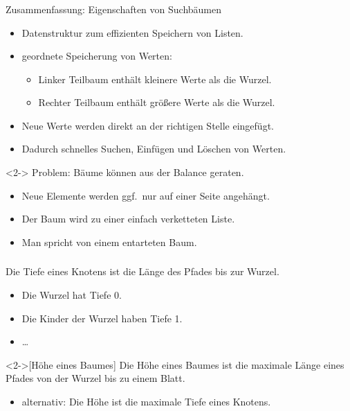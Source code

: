\begin{frame}
\frametitle{\insertsection}
\begin{block}
{Zusammenfassung: Eigenschaften von Suchbäumen}
\begin{itemize}
	\item Datenstruktur zum effizienten Speichern von Listen.
	\item geordnete Speicherung von Werten:
		\begin{itemize}
			\item Linker Teilbaum enthält kleinere Werte als die Wurzel.
			\item Rechter Teilbaum enthält größere Werte als die Wurzel.
		\end{itemize}
	\item Neue Werte werden direkt an der richtigen Stelle eingefügt.
	\item Dadurch schnelles Suchen, Einfügen und Löschen von Werten.
\end{itemize}
\end{block}
\begin{block}<2->
{\alert{Problem:} Bäume können aus der Balance geraten.}
	\begin{itemize}
		\item Neue Elemente werden ggf.\ nur auf einer Seite angehängt.
		\item Der Baum wird zu einer einfach verketteten Liste.
		\item Man spricht von einem \alert{entarteten Baum}.
	\end{itemize}
\end{block}
	
\end{frame}

\begin{frame}
\frametitle{\insertsection}
\begin{definition}
	Die \alert{Tiefe} eines Knotens ist die Länge des Pfades bis zur Wurzel.
	\begin{itemize}
		\item Die Wurzel hat Tiefe 0.
		\item Die Kinder der Wurzel haben Tiefe 1.
		\item \ldots
	\end{itemize}
\end{definition}

\begin{definition}<2->[Höhe eines Baumes]
	Die \alert{Höhe} eines Baumes ist die maximale Länge eines Pfades von der Wurzel bis zu einem Blatt.
	\begin{itemize}
		\item alternativ: Die Höhe ist die maximale Tiefe eines Knotens.
	\end{itemize}
\end{definition}
\end{frame}

